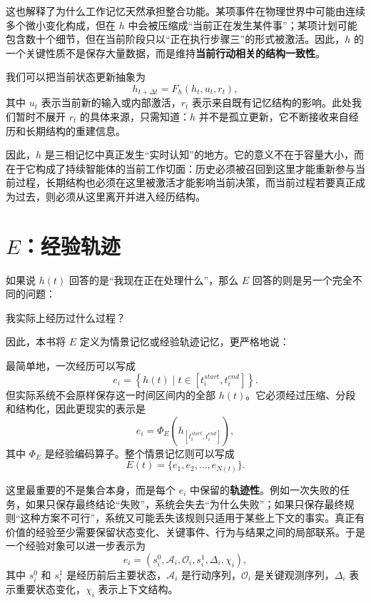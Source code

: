 这也解释了为什么工作记忆天然承担整合功能。某项事件在物理世界中可能由连续多个微小变化构成，但在 $h$ 中会被压缩成“当前正在发生某件事”；某项计划可能包含数十个细节，但在当前阶段只以“正在执行步骤三”的形式被激活。因此，$h$ 的一个关键性质不是保存大量数据，而是维持\textbf{当前行动相关的结构一致性}。

我们可以把当前状态更新抽象为
\[
h_{t+\Delta t}
=
F_h
\left(
h_t,
u_t,
r_t
\right),
\]
其中 $u_t$ 表示当前新的输入或内部激活，$r_t$ 表示来自既有记忆结构的影响。此处我们暂时不展开 $r_t$ 的具体来源，只需知道：$h$ 并不是孤立更新，它不断接收来自经历和长期结构的重建信息。

因此，$h$ 是三相记忆中真正发生“实时认知”的地方。它的意义不在于容量大小，而在于它构成了持续智能体的当前工作切面：历史必须被召回到这里才能重新参与当前过程，长期结构也必须在这里被激活才能影响当前决策，而当前过程若要真正成为过去，则必须从这里离开并进入经历结构。

\section{$E$：经验轨迹}

如果说 $h(t)$ 回答的是“我现在正在处理什么”，那么 $E$ 回答的则是另一个完全不同的问题：
\begin{statementbox}
我实际上经历过什么过程？
\end{statementbox}
因此，本书将 $E$ 定义为情景记忆或经验轨迹记忆，更严格地说：
\begin{statementbox}
\centering
{}
\end{statementbox}

最简单地，一次经历可以写成
\[
e_i
=
\left\{
h(t)
\mid
t\in[t_i^{start},t_i^{end}]
\right\}.
\]
但实际系统不会原样保存这一时间区间内的全部 $h(t)$。它必须经过压缩、分段和结构化，因此更现实的表示是
\[
e_i
=
\Phi_E
\left(
h_{[t_i^{start},t_i^{end}]}
\right),
\]
其中 $\Phi_E$ 是经验编码算子。整个情景记忆则可以写成
\[
E(t)
=
\{e_1,e_2,\ldots,e_{N(t)}\}.
\]

这里最重要的不是集合本身，而是每个 $e_i$ 中保留的\textbf{轨迹性}。例如一次失败的任务，如果只保存最终结论“失败”，系统会失去“为什么失败”；如果只保存最终规则“这种方案不可行”，系统又可能丢失该规则只适用于某些上下文的事实。真正有价值的经验至少需要保留状态变化、关键事件、行为与结果之间的局部联系。于是一个经验对象可以进一步表示为
\[
e_i
=
\left(
s_i^{0},
\mathcal{A}_i,
\mathcal{O}_i,
s_i^{1},
\Delta_i,
\chi_i
\right),
\]
其中 $s_i^{0}$ 和 $s_i^{1}$ 是经历前后主要状态，$\mathcal{A}_i$ 是行动序列，$\mathcal{O}_i$ 是关键观测序列，$\Delta_i$ 表示重要状态变化，$\chi_i$ 表示上下文结构。

